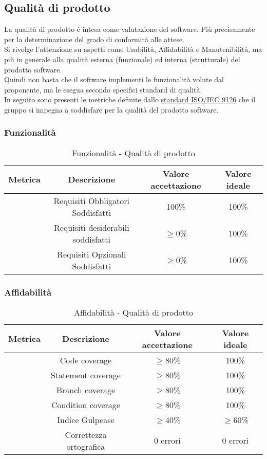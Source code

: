 \documentclass[11pt]{article}
\begin{document}
\begin{justify}
\subsection{Qualità di prodotto}\label{qpd}
La qualità di prodotto è intesa come valutazione del software. Più precisamente per la determinazione del grado di conformità alle attese.\\
Si rivolge l'attenzione su aspetti come Usabilità, Affidabilità e Manutenibilità, ma più in generale alla qualità esterna (funzionale) ed interna (strutturale) del prodotto software.\\
Quindi non basta che il software implementi le funzionalità volute dal proponente, ma le esegua secondo specifici standard di qualità.\\
In seguito sono presenti le metriche definite dallo \hyperref[ISO 9126]{standard ISO/IEC 9126} che il gruppo si impegna a soddisfare per la qualità del prodotto software.
\subsubsection{Funzionalità}
\begin{table}[H]
  \centering
\begin{tabular}{|c|c|c|c|}
  \hline
  \textbf{Metrica} & \textbf{Descrizione} & \textbf{Valore accettazione} & \textbf{Valore ideale}\\
  \hline
  & Requisiti Obbligatori Soddisfatti & 100\% & 100\%\\
  \hline
  & Requisiti desiderabili soddisfatti  & $\geq$0\% & 100\% \\
  \hline
  & Requisiti Opzionali Soddisfatti & $\geq$0\% & 100\% \\
  \hline
\end{tabular}
\caption{Funzionalità - Qualità di prodotto}
\label{tab:funzionalità}
\end{table}

\subsubsection{Affidabilità}
\begin{table}[H]
  \centering
\begin{tabular}{|c|c|c|c|}
  \hline
  \textbf{Metrica} & \textbf{Descrizione} & \textbf{Valore accettazione} & \textbf{Valore ideale}\\
  \hline
  & Code coverage & $\geq$80\% & 100\% \\
  \hline
  & Statement coverage & $\geq$80\% & 100\% \\
  \hline
  & Branch coverage & $\geq$80\% & 100\% \\
  \hline
  & Condition coverage & $\geq$80\% & 100\% \\
  \hline
  & Indice Gulpease & $\geq$40\% & $\geq$60\% \\
  \hline
  & Correttezza ortografica & 0 errori & 0 errori \\
  \hline
\end{tabular}
\caption{Affidabilità - Qualità di prodotto}
\label{tab:affidabilità}
\end{table}


\end{justify}
\end{document}
